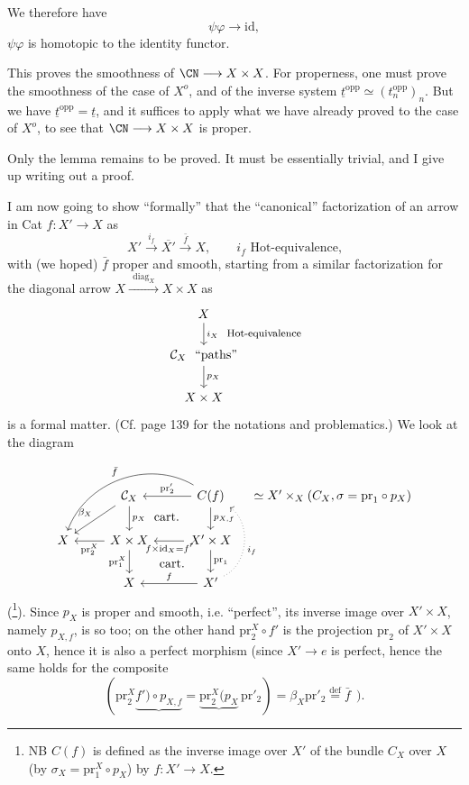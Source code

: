 We therefore have
\[ \psi\varphi \longrightarrow \mathrm{id}, \]
$\psi\varphi$ is homotopic to the identity functor.

This proves the smoothness of $\CN \longrightarrow X \times X$. For properness, one must prove the smoothness of the case of $X^o$, and of the inverse system $\underline{t}^{\mathrm{opp}} \simeq (t_n^{\mathrm{opp}})_n$. But we have $\underline{t}^{\mathrm{opp}} = \underline{t}$, and it suffices to apply what we have already proved to the case of $X^o$, to see that $\CN \longrightarrow X \times X$ is proper. %

Only the lemma remains to be proved. It must be essentially
trivial, and I give up writing out a proof.

I am now going to show ``formally'' that the ``canonical'' factorization of an arrow in Cat $f : X' \longrightarrow X$ as
\[ X' \xrightarrow{i_f} \overline{X'} \xrightarrow{\bar{f}} X, \qquad i_f \text{ Hot-equivalence,} \]
with (we hoped) $\bar{f}$ proper and smooth, starting from a similar factorization for the diagonal arrow $X \xrightarrow{\ \ \mathrm{diag}_X\ \ } X \times X$ as
\[
\begin{tikzcd}
X \arrow[d, "i_X\ \ \text{\footnotesize Hot-equivalence}"] \\
\mathcal{C}_X\ \ \text{``paths''} \arrow[d, "p_X"] \\
X \times X
\end{tikzcd}
\]
is a formal matter. (Cf. page 139 for the notations and problematics.) We look at the diagram
\[
\begin{tikzcd}
 & \mathcal{C}_X \arrow[d, "p_X"] \arrow[dl, "\beta_X"'] \arrow[dr, phantom, "\text{cart.}"] & C(f) \arrow[l, "\mathrm{pr}'_2"'] \arrow[d, "p_{X,f}"] \arrow[dll, bend right=50, "\bar{f}"'] & [-1.5em] \simeq X' \times_X (C_X, \sigma = \mathrm{pr}_1 \circ p_X) \\ %
X & X \times X \arrow[l, "\mathrm{pr}_2^X"] \arrow[d, "\mathrm{pr}_1^X"'] \arrow[dr, phantom, "\text{cart.}"] & X' \times X \arrow[l, "f \times \mathrm{id}_X = f'"] \arrow[d, "\mathrm{pr}_1"] & \\
 & X & X' \arrow[l, "f"'] \arrow[uu, bend right=60, dotted, "i_f"'] &
\end{tikzcd}
\]
(\footnote[40]{NB $C(f)$ is defined as the inverse image over $X'$ of the bundle $C_X$ over $X$ (by $\sigma_X = \mathrm{pr}_1^X \circ p_X$) by $f : X' \longrightarrow X$.}). Since $p_X$ is proper and smooth, i.e. ``perfect'', its inverse image over $X' \times X$, namely $p_{X,f}$, is so too; on the other hand $\mathrm{pr}_2^X \circ f'$ is the
projection $\mathrm{pr}_2$ of $X' \times X$ onto $X$, hence it is also a perfect morphism (since $X' \longrightarrow e$ is perfect, hence the same holds for the composite
\[ (\mathrm{pr}_2^X \underbrace{f') \circ p_{X,f}} = \underbrace{\mathrm{pr}_2^X(p_X}\, \mathrm{pr}'_2) = \beta_X \mathrm{pr}'_2 \overset{\text{def}}{=} \bar{f} \ \ ). \]

